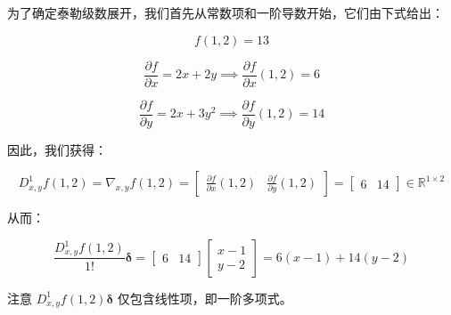 \begin{notebox}
为了确定泰勒级数展开，我们首先从常数项和一阶导数开始，它们由下式给出：

\begin{equation}
f(1, 2) = 13
\tag{5.162}\label{eq:5-162}
\end{equation}

\begin{equation}
\frac{\partial f}{\partial x} = 2x + 2y \implies \frac{\partial f}{\partial x}(1, 2) = 6
\tag{5.163}\label{eq:5-163}
\end{equation}

\begin{equation}
\frac{\partial f}{\partial y} = 2x + 3y^2 \implies \frac{\partial f}{\partial y}(1, 2) = 14
\tag{5.164}\label{eq:5-164}
\end{equation}

因此，我们获得：

\begin{equation}
D_{x,y}^1 f(1, 2) = \nabla_{x,y} f(1, 2) = \begin{bmatrix} \frac{\partial f}{\partial x}(1, 2) & \frac{\partial f}{\partial y}(1, 2) \end{bmatrix} = \begin{bmatrix} 6 & 14 \end{bmatrix} \in \mathbb{R}^{1 \times 2}
\tag{5.165}\label{eq:5-165}
\end{equation}

从而：

\begin{equation}
\frac{D_{x,y}^1 f(1, 2)}{1!} \boldsymbol{\delta} = \begin{bmatrix} 6 & 14 \end{bmatrix} \begin{bmatrix} x - 1 \\ y - 2 \end{bmatrix} = 6(x - 1) + 14(y - 2)
\tag{5.166}\label{eq:5-166}
\end{equation}

注意 $ D_{x,y}^1 f(1, 2)\boldsymbol{\delta} $ 仅包含线性项，即一阶多项式。
\end{notebox}

